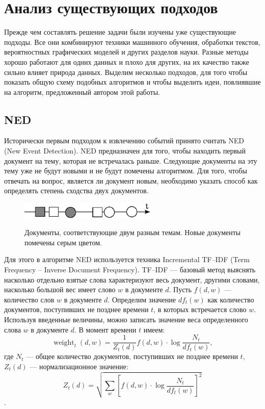 \documentclass[12pt, a4paper]{article}
\newcommand\todo[1]{\marginpar{\textcolor{red}{#1}}}
\DeclareMathOperator{\weight}{weight}
\begin{document}
  \section{Анализ существующих подходов}
  Прежде чем составлять решение задачи были изучены уже существующие подходы. Все они комбинируют техники машинного обучения, обработки текстов, вероятностных графических моделей и других разделов науки. Разные методы хорошо работают для одних данных и плохо для других, на их качество также сильно влияет природа данных. Выделим несколько подходов, для того чтобы показать общую схему подобных алгоритмов и чтобы выделить идеи, повлиявшие на алгоритм, предложенный автором этой работы.
  
  \todo{сделать введение и заключение к каждому методу}
  
  \subsection{NED}
  \label{ned-subsection}
	Исторически первым подходом к извлечению событий принято считать NED (New Event Detection)\cite{ned}. NED предназначен для того, чтобы находить первый документ на тему, которая не встречалась раньше. Следующие документы на эту тему уже не будут новыми и не будут помечены алгоритмом. Для того, чтобы отвечать на вопрос, является ли документ новым, необходимо указать способ как определять степень сходства двух документов.
	
\begin{figure}[H]
  \centering
  \includegraphics[width=0.58\textwidth]{ned.eps}
  \\
  \caption{Документы, соответствующие двум разным темам. Новые документы помечены серым цветом.}
  \end{figure}  

	Для этого в алгоритме NED используется техника Incremental TF--IDF (Term Frequency -- Inverse Document Frequency). TF--IDF --- базовый метод выяснять насколько отдельно взятые слова характеризуют весь документ, другими словами, насколько большой вес имеет слово $w$ в документе $d$. Пусть $f(d,w)$ --- количество слов $w$ в документе $d$. Определим значение $df_t(w)$ как количество документов, поступивших не позднее времени $t$, в которых встречается слово $w$. Используя введенные величины, можно записать значение веса определенного слова $w$ в документе $d$. В момент времени $t$ имеем:
	\begin{equation}
	\weight_t(d,w) = \frac{1}{Z_t(d)}f(d,w) \cdot \log \frac{N_t}{df_t(w)},
	\end{equation}
	где $N_t$ --- общее количество документов, поступивших не позднее времени $t$, $Z_t(d)$ --- нормализационное значение:
	\begin{equation}
	Z_t(d) = \sqrt{\sum_w \left[ f(d,w) \cdot \log \frac{N_t}{df_t(w)} \right]^2}
	\end{equation}.
	
\end{document}
